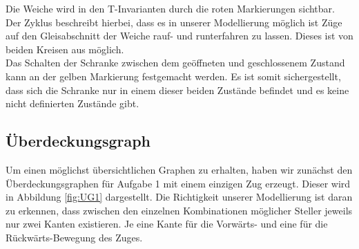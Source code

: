\documentclass[10pt]{scrartcl}
\begin{document}
Die Weiche wird in den T-Invarianten durch die roten Markierungen sichtbar.
Der Zyklus beschreibt hierbei, dass es in unserer Modellierung möglich ist Züge auf den Gleisabschnitt der Weiche rauf- und runterfahren zu lassen. Dieses ist von beiden Kreisen aus möglich.\\

Das Schalten der Schranke zwischen dem geöffneten und geschlossenem Zustand kann an der gelben Markierung festgemacht werden.
Es ist somit sichergestellt, dass sich die Schranke nur in einem dieser beiden Zustände befindet und es keine nicht definierten Zustände gibt. 

\subsection{Überdeckungsgraph}
Um einen möglichst übersichtlichen Graphen zu erhalten, haben wir zunächst den Überdeckungsgraphen für Aufgabe 1 mit einem einzigen Zug erzeugt. Dieser wird in Abbildung \ref{fig:UG1} dargestellt. Die Richtigkeit unserer Modellierung ist daran zu erkennen, dass zwischen den einzelnen Kombinationen möglicher Steller jeweils nur zwei Kanten existieren. Je eine Kante für die Vorwärts- und eine für die Rückwärts-Bewegung des Zuges.
\end{document}
